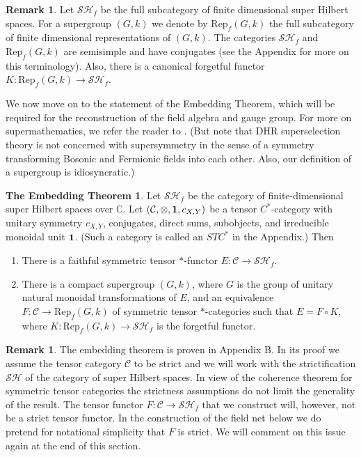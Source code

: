 \documentclass[12pt]{article}
\newenvironment{bxd}%
  {\bigskip\noindent\begin{Sbox}\begin{minipage}{0.9\textwidth} }%
  {\end{minipage}\end{Sbox}\fbox{\TheSbox}\bigskip}%
\theoremstyle{definition}
\newtheorem*{emb}{The Embedding Theorem}
\theoremstyle{definition}
\newtheorem{note}[thm]{Remark}
\theoremstyle{remark}
\def\2#1{{\mathcal #1}}
\def\7#1{{\mathbb #1}}
\def\1#1{{\bf #1}}
\newcommand{\Rep}{\mathrm{Rep}}
\newcommand{\rarr}{\rightarrow}
\begin{document}
\begin{note} Let $\2S\2H_f$ be the full subcategory of
  finite dimensional super Hilbert spaces.  For a
  supergroup $(G,k)$ we denote by $\Rep _f(G,k)$ the
  full subcategory of finite dimensional
  representations of $(G,k)$.  The categories $\2S\2H
  _f$ and $\Rep _f(G,k)$ are semisimple and have
  conjugates (see the Appendix for more on this
  terminology).  Also, there is a canonical forgetful
  functor $K:\Rep _f(G,k)\to \2S\2H_f$.  \end{note}

We now move on to the statement of the Embedding
Theorem, which will be required for the reconstruction
of the field algebra and gauge group.  For more on
supermathematics, we refer the reader to
\cite{vara,super}.  (But note that DHR superselection
theory is not concerned with supersymmetry in the sense
of a symmetry transforming Bosonic and Fermionic fields
into each other.  Also, our definition of a supergroup
is idiosyncratic.)



\begin{bxd} \begin{emb} Let $\2S\2H_f$ be the category of
    finite-dimensional super Hilbert spaces over $\7C$.  Let $(\2C
    ,\otimes ,\11 ,c_{X,Y})$ be a tensor $C^*$-category with unitary
    symmetry $c_{X,Y}$, conjugates, direct sums, subobjects, and
    irreducible monoidal unit $\11$. (Such a category is called an
    $STC^*$ in the Appendix.)  Then
\begin{enumerate}
\item There is a faithful symmetric tensor $*$-functor $E:\2C\to \2S\2H_f$.
\item There is a compact supergroup $(G,k)$, where $G$ is the group of unitary
  natural monoidal transformations of $E$, and an equivalence $F:\2C \to \Rep
  _f(G,k)$ of symmetric tensor $*$-categories such that $E=F\circ K$, where $K:\Rep
  _f(G,k)\to \2S\2H_f$ is the forgetful functor.
\end{enumerate}
\end{emb}
\end{bxd}

\begin{note}
  The embedding theorem is proven in Appendix B.  In its proof we
  assume the tensor category $\2C$ to be strict and we will work with
  the strictification $\2S\2H$ of the category of super Hilbert
  spaces. In view of the coherence theorem for symmetric tensor
  categories the strictness assumptions do not limit the generality of
  the result. The tensor functor $F:\2C\rarr\2S\2H_f$ that we
  construct will, however, not be a strict tensor functor. In the
  construction of the field net below we do pretend for notational
  simplicity that $F$ is strict. We will comment on this issue again
  at the end of this section.
\end{note}
\end{document}

